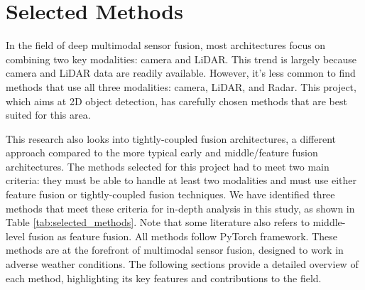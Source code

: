 \documentclass[report.tex]{subfiles}
\begin{document}
    \section{Selected Methods}
    \label{sec:selected_methods}


    In the field of deep multimodal sensor fusion, most architectures focus on combining two key modalities: camera and LiDAR. This trend is largely because camera and LiDAR data are readily available. However, it's less common to find methods that use all three modalities: camera, LiDAR, and Radar. This project, which aims at 2D object detection, has carefully chosen methods that are best suited for this area.

    This research also looks into tightly-coupled fusion architectures, a different approach compared to the more typical early and middle/feature fusion architectures. The methods selected for this project had to meet two main criteria: they must be able to handle at least two modalities and must use either feature fusion or tightly-coupled fusion techniques. We have identified three methods that meet these criteria for in-depth analysis in this study, as shown in Table \ref{tab:selected_methods}. Note that some literature also refers to middle-level fusion as feature fusion. All methods follow PyTorch framework. These methods are at the forefront of multimodal sensor fusion, designed to work in adverse weather conditions. The following sections provide a detailed overview of each method, highlighting its key features and contributions to the field.
\end{document}
